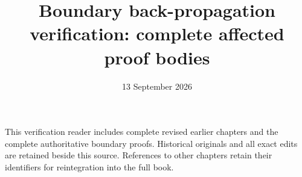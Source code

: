 \documentclass[11pt,a4paper]{article}
\title{Boundary back-propagation verification: complete affected proof bodies}
\author{}\date{13 September 2026}
\theoremstyle{definition}\newtheorem{definition}[theorem]{Definition}
\theoremstyle{remark}\newtheorem{remark}[theorem]{Remark}
\begin{document}
\maketitle
This verification reader includes complete revised earlier chapters and
the complete authoritative boundary proofs. Historical originals and
all exact edits are retained beside this source. References to other
chapters retain their identifiers for reintegration into the full book.













\end{document}
